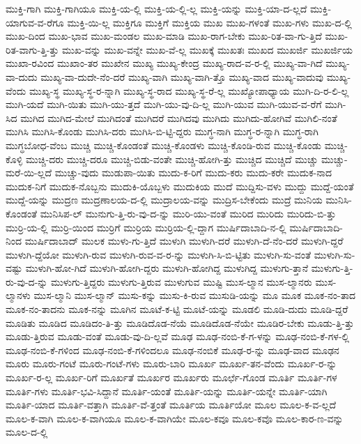 {ಮುಕ್ತಿ-ಗಾಗಿ
ಮುಕ್ತಿ-ಗಾಗಿಯೂ
ಮುಕ್ತಿ-ಯ-ಲ್ಲಿ
ಮುಕ್ತಿ-ಯ-ಲ್ಲಿ-ಲ್ಲ
ಮುಕ್ತಿ-ಯನ್ನು
ಮುಕ್ತಿ-ಯಾ-ದ-ಲ್ಲದೆ
ಮುಕ್ತಿ-ಯಾಗುವ-ವ-ರೆಗೂ
ಮುಕ್ತಿ-ಯಿ-ಲ್ಲ
ಮುಕ್ತಿಗೂ
ಮುಕ್ತಿಗೆ
ಮುಕ್ತಿಯ
ಮುಖ
ಮುಖ-ಗಳಂತೆ
ಮುಖ-ಗಳು
ಮುಖ-ದ-ಲ್ಲಿ
ಮುಖ-ದಿಂದ
ಮುಖ-ಭಾವ
ಮುಖ-ಮಂಡಲ
ಮುಖ-ಮಾಡಿ
ಮುಖ-ರಾಗ-ಬೇಕು
ಮುಖ-ರಿತ-ವಾ-ಗು-ತ್ತಿದೆ
ಮುಖ-ರಿತ-ವಾಗು-ತ್ತಿ-ತ್ತು
ಮುಖ-ವನ್ನು
ಮುಖ-ವನ್ನೇ
ಮುಖ-ವೆ-ಲ್ಲ
ಮುಖಕ್ಕೆ
ಮುಖತಃ
ಮುಖದ
ಮುಖರ್ಜಿ
ಮುಖರ್ಜಿಯ
ಮುಖಾ-ರವಿಂದ
ಮುಖಾಂ-ತರ
ಮುಖೇನ
ಮುಖ್ಯ
ಮುಖ್ಯ-ಕೇಂದ್ರ
ಮುಖ್ಯ-ರಾದ-ವ-ರ-ಲ್ಲಿ
ಮುಖ್ಯ-ವಾ-ಗಿದೆ
ಮುಖ್ಯ-ವಾ-ದುದು
ಮುಖ್ಯ-ವಾ-ದುದೇ-ನೆಂ-ದರೆ
ಮುಖ್ಯ-ವಾಗಿ
ಮುಖ್ಯ-ವಾಗಿ-ತ್ತೊ
ಮುಖ್ಯ-ವಾದ
ಮುಖ್ಯ-ವಾದುವು
ಮುಖ್ಯ-ವೆಂದು
ಮುಖ್ಯ-ಸ್ಥ
ಮುಖ್ಯ-ಸ್ಥ-ರ-ನ್ನಾಗಿ
ಮುಖ್ಯ-ಸ್ಥ-ರಾದ
ಮುಖ್ಯ-ಸ್ಥ-ರೆ-ಲ್ಲ
ಮುಖ್ಯೋಪಾಧ್ಯಾಯ
ಮುಗಿ-ದಿ-ರ-ಲಿ-ಲ್ಲ
ಮುಗಿ-ಯದೆ
ಮುಗಿ-ಯಿತು
ಮುಗಿ-ಯು-ತ್ತದೆ
ಮುಗಿ-ಯು-ವು-ದಿ-ಲ್ಲ
ಮುಗಿ-ಯುವ
ಮುಗಿ-ಯುವ-ವ-ರೆಗೆ
ಮುಗಿ-ಸಿದ
ಮುಗಿದ
ಮುಗಿದ-ಮೇಲೆ
ಮುಗಿದಂತೆ
ಮುಗಿದರೆ
ಮುಗಿದವು
ಮುಗಿದು
ಮುಗಿದು-ಹೋಗಿವೆ
ಮುಗಿಲಿ-ನಂತೆ
ಮುಗಿಸಿ
ಮುಗಿಸಿ-ಕೊಂಡು
ಮುಗಿಸಿ-ದರು
ಮುಗಿಸಿ-ಬಿ-ಟ್ಟಿ-ದ್ದರು
ಮುಗ್ಧ-ನಾಗಿ
ಮುಗ್ಧ-ರ-ನ್ನಾಗಿ
ಮುಗ್ಧ-ರಾಗಿ
ಮುಗ್ಧಬೋಧ-ವೆಂಬ
ಮುಚ್ಚಿ
ಮುಚ್ಚಿ-ಕೊಂಡಂತೆ
ಮುಚ್ಚಿ-ಕೊಂಡಳು
ಮುಚ್ಚಿ-ಕೊಂಡಿ-ರುವ
ಮುಚ್ಚಿ-ಕೊಂಡು
ಮುಚ್ಚಿ-ಕೊಳ್ಳಿ
ಮುಚ್ಚಿ-ದರು
ಮುಚ್ಚಿ-ದರೂ
ಮುಚ್ಚಿ-ಬಿಡು-ವಂತೇ
ಮುಚ್ಚಿ-ಹೋಗಿ-ತ್ತು
ಮುಚ್ಚಿದ
ಮುಚ್ಚಿದೆ
ಮುಚ್ಚು
ಮುಚ್ಚು-ಮರೆ-ಯಿ-ಲ್ಲದೆ
ಮುಚ್ಚು-ವುದು
ಮುಡುಪಾ-ಯಿತು
ಮುದು-ಕ-ರಿಗೆ
ಮುದು-ಕರು
ಮುದು-ಕರೇ
ಮುದುಕ-ನಾದ
ಮುದುಕ-ನಿಗೆ
ಮುದುಕ-ನೊಬ್ಬನು
ಮುದುಕಿ-ಯೊಬ್ಬಳು
ಮುದುಕಿಯ
ಮುದೆ
ಮುದ್ದಿಸು-ವಳು
ಮುದ್ದು
ಮುದ್ದೆ-ಯಂತೆ
ಮುದ್ದೆ-ಯನ್ನು
ಮುದ್ರಣ
ಮುದ್ರಣಾಲಯ-ದ-ಲ್ಲಿ
ಮುದ್ರಾಲಯ-ವನ್ನು
ಮುದ್ರಿಸ-ಬೇಕೆಂದು
ಮುದ್ರೆ
ಮುನಿಯ
ಮುನಿಸಿ-ಕೊಂಡಂತೆ
ಮುನಿಸಿಪ-ಲ್
ಮುನುಗು-ತ್ತಿ-ರು-ವು-ದ-ನ್ನು
ಮುರಿ-ಯು-ವಂತೆ
ಮುರಿದ
ಮುರಿದು
ಮುರಿದು-ಬಿ-ತ್ತು
ಮುರ್ರಿ-ಯ-ಲ್ಲಿ
ಮುರ್ರಿ-ಯಿಂದ
ಮುರ್ರಿಗೆ
ಮುರ್ರಿಯ
ಮುರ್ರಿಯ-ಲ್ಲಿ-ದ್ದಾಗ
ಮುರ್ಷಿದಾಬಾದಿ-ನ-ಲ್ಲಿ
ಮುರ್ಷಿದಾಬಾದಿ-ನಿಂದ
ಮುರ್ಷಿದಾಬಾದ್
ಮುಲಕ
ಮುಳು-ಗು-ತ್ತಿದೆ
ಮುಳುಗಿ
ಮುಳುಗಿ-ದರೆ
ಮುಳುಗಿ-ದೆ-ನೆಂ-ದರೆ
ಮುಳುಗಿ-ದ್ದರೆ
ಮುಳುಗಿ-ದ್ದೆಯೋ
ಮುಳುಗಿ-ರುವ
ಮುಳುಗಿ-ರುವ-ವ-ರ-ನ್ನು
ಮುಳುಗಿ-ಸಿ-ಬಿ-ಟ್ಟಿತು
ಮುಳುಗಿ-ಸು-ವಂತೆ
ಮುಳುಗಿ-ಸು-ವಷ್ಟು
ಮುಳುಗಿ-ಹೋ-ಗಿದೆ
ಮುಳುಗಿ-ಹೋಗಿ-ದ್ದರು
ಮುಳುಗಿ-ಹೋಗಿದ್ದ
ಮುಳುಗಿದ್ದ
ಮುಳುಗು-ತ್ತಾನೆ
ಮುಳುಗು-ತ್ತಿ-ರು-ವು-ದ-ನ್ನು
ಮುಳುಗು-ತ್ತಿದ್ದರು
ಮುಳುಗು-ತ್ತಿರುವ
ಮುಳುಗುವ
ಮುಷ್ಟಿ
ಮುಸ-ಲ್ಮಾನ
ಮುಸ-ಲ್ಮಾನರು
ಮುಸ-ಲ್ಮಾನಳು
ಮುಸ-ಲ್ಮಾನಿ
ಮುಸ-ಲ್ಮಾನ್
ಮುಸು-ಕನ್ನು
ಮುಸು-ಕಿ-ರುವ
ಮುಸುಡಿ-ಯನ್ನು
ಮೂ
ಮೂಕ
ಮೂಕ-ನಂ-ತಾದ
ಮೂಕ-ನಂ-ತಾದನು
ಮೂಕ-ನನ್ನು
ಮೂಗಿನ
ಮೂಟೆ-ಕ-ಟ್ಟಿ
ಮೂಟೆ-ಯನ್ನು
ಮೂಡಲಿ
ಮೂಡಿ-ದುದು
ಮೂಡಿ-ದ್ದರೆ
ಮೂಡಿತು
ಮೂಡಿದ
ಮೂಡಿದಂ-ತಿ-ತ್ತು
ಮೂಡಿದೊಡ-ನೆಯೆ
ಮೂಡಿದೊಡ-ನೆಯೇ
ಮೂಡಿರ-ಬೇಕು
ಮೂಡು-ತ್ತಿ-ತ್ತು
ಮೂಡು-ತ್ತಿರುವ
ಮೂಡು-ವಂತೆ
ಮೂಡು-ವು-ದಿ-ಲ್ಲವೆ
ಮೂಢ
ಮೂಢ-ನಂಬಿ-ಕೆ-ಗ-ಳನ್ನು
ಮೂಢ-ನಂಬಿ-ಕೆ-ಗಳ-ಲ್ಲಿ
ಮೂಢ-ನಂಬಿ-ಕೆ-ಗಳಿಂದ
ಮೂಢ-ನಂಬಿ-ಕೆ-ಗಳಿಂದಲೂ
ಮೂಢ-ನಂಬಿಕೆ
ಮೂಢ-ರ-ನ್ನು
ಮೂಢ-ವಾದ
ಮೂಢನ
ಮೂರು
ಮೂರು-ಗಂಟೆ
ಮೂರು-ಗಂಟೆ-ಗಳು
ಮೂರು-ಬಾರಿ
ಮೂರ್ಖ
ಮೂರ್ಖ-ತನ-ವೆಂದು
ಮೂರ್ಖ-ರ-ನ್ನು
ಮೂರ್ಖ-ರ-ಲ್ಲ
ಮೂರ್ಖ-ರಿಗೆ
ಮೂರ್ಖತೆ
ಮೂರ್ಖರ
ಮೂರ್ಖರು
ಮೂರ್ಛೆ-ಗೊಂಡ
ಮೂರ್ತಿ
ಮೂರ್ತಿ-ಗಳ
ಮೂರ್ತಿ-ಗಳು
ಮೂರ್ತಿ-ಭವಿ-ಸಿದ್ದಾನೆ
ಮೂರ್ತಿ-ಯಂತೆ
ಮೂರ್ತಿ-ಯನ್ನು
ಮೂರ್ತಿ-ಯನ್ನೇ
ಮೂರ್ತಿ-ಯಾಗಿ
ಮೂರ್ತಿ-ಯಾದ
ಮೂರ್ತಿ-ವತ್ತಾಗಿ
ಮೂರ್ತಿ-ವೆ-ತ್ತಂತೆ
ಮೂರ್ತಿಯ
ಮೂರ್ತಿಯೋ
ಮೂಲ
ಮೂಲ-ಕ-ವ-ಲ್ಲದೆ
ಮೂಲ-ಕ-ವಾಗಿ
ಮೂಲ-ಕ-ವಾಗಿಯೂ
ಮೂಲ-ಕ-ವಾಗಿಯೇ
ಮೂಲ-ಕವೂ
ಮೂಲ-ಕವೊ
ಮೂಲ-ಕಾರ-ಣ-ವನ್ನು
ಮೂಲ-ದ-ಲ್ಲಿ
}
